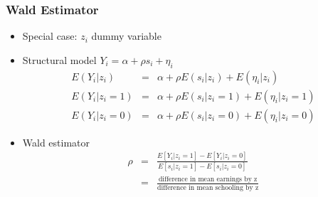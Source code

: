 \documentclass[pdftex]{beamer}
\begin{document}



\begin{frame}
\frametitle{Wald Estimator}
\begin{itemize}
\item Special case:  $z_{i}$ dummy variable
\item Structural model $Y_{i} = \alpha+ \rho s_{i}+ \eta_{i}$
\begin{eqnarray*}
 E(Y_i|z_i) &=&  \alpha + \rho E(s_i|z_i)  +  E(\eta_i|z_i) \\
 E(Y_i|z_i=1) &=&  \alpha  + \rho E(s_i|z_i=1) +  E(\eta_i|z_i=1) \\
 E(Y_i|z_i=0) &=&   \alpha  + \rho E(s_i|z_i=0)+  E(\eta_i|z_i=0) 
\end{eqnarray*}

\item Wald estimator
\begin{eqnarray*}
 \rho &=& \frac{E\left[Y_{i}|z_{i}=1\right]-E\left[Y_{i}|z_{i}=0\right]}{E\left[s_{i}|z_{i}=1\right]-E\left[s_{i}|z_{i}=0\right]} \\
 &=&\frac{\text{difference in mean earnings by z}}{\text {difference in mean schooling by z}}
\end{eqnarray*}

\end {itemize}
\end {frame}
\end{document}

